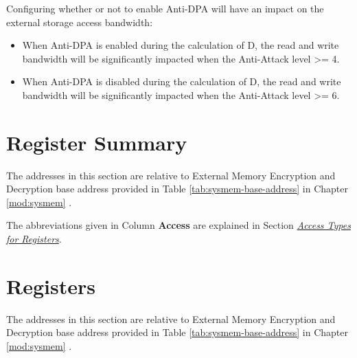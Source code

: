 \documentclass[main\_\_EN.tex]{subfiles}
\begin{document}
\vspace{-0.5em}
\begin{tiplisting}
Configuring whether or not to enable Anti-DPA will have an impact on the external storage access bandwidth:
\vspace{-0.5em}
\begin{itemize}
    \item When Anti-DPA is enabled during the calculation of D, the read and write bandwidth will be significantly impacted when the Anti-Attack level >= 4.
    \item When Anti-DPA is disabled during the calculation of D, the read and write bandwidth will be significantly impacted when the Anti-Attack level >= 6.
\end{itemize}
\end{tiplisting}




\clearpage
\section{Register Summary}
\label{sec:extmemencr-reg-summ}
\hypertarget{extmemencr-reg-summ}{}

The addresses in this section are relative to External Memory Encryption and Decryption base address provided in Table \ref{tab:sysmem-base-address} in Chapter \ref{mod:sysmem} \textit{}.

The abbreviations given in Column \textbf{Access} are explained in Section \hyperref[glossary-access-types]{\textit{Access Types for Registers}}.





\clearpage
\section{Registers}

The addresses in this section are relative to External Memory Encryption and Decryption base address provided in Table \ref{tab:sysmem-base-address} in Chapter \ref{mod:sysmem} \textit{}.


\end{document}

